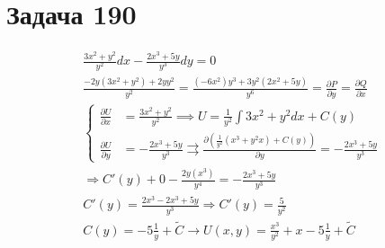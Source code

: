 \section{Задача 190}

\begin{gather}
\frac{3x^2+y^2}{y^2}dx -\frac{2x^3+5y}{y^3}dy=0\\
\frac{-2y(3x^2+y^2)+2yy^2}{y^2}=\frac{(-6x^2)y^3+3y^2(2x^2+5y)}{y^6}=\frac{\partial P}{\partial y}=\frac{\partial Q}{\partial x}\\
\left\{ \begin{aligned}
  \frac{\partial U}{\partial x} &= \frac{3x^2+y^2}{y^2}\implies U=\frac{1}{y^2}\int3x^2+y^2dx+C(y)  \\
  \frac{\partial U}{\partial y} &= -\frac{2x^3+5y}{y^3}  \rightrightarrows  \frac{\partial (\frac{1}{y^2}(x^3+y^2x)+C(y))}{\partial y}=-\frac{2x^3+5y}{y^3} 
\end{aligned} \right.\\
\Longrightarrow  C'(y)+0-\frac{2y(x^3)}{y^4}=-\frac{2x^3+5y}{y^3}\\
C'(y)=\frac{2x^3-2x^3+5y}{y^3}\Rightarrow C'(y)=\frac{5}{y^2}\\
C(y)=-5\frac{1}{y}+\widetilde C\longrightarrow \boxed{ U(x,y)=\frac{x^3}{y^2}+x-5\frac{1}{y}+\widetilde{C}}
\end{gather}


